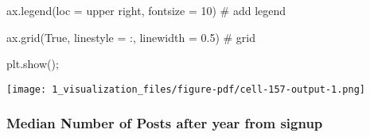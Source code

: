 \documentclass[
  letterpaper,
  DIV=11,
  numbers=noendperiod]{scrartcl}
\newenvironment{Shaded}{\begin{snugshade}}{\end{snugshade}}
\newcommand{\CommentTok}[1]{\textcolor[rgb]{0.37,0.37,0.37}{#1}}
\newcommand{\DecValTok}[1]{\textcolor[rgb]{0.68,0.00,0.00}{#1}}
\newcommand{\FloatTok}[1]{\textcolor[rgb]{0.68,0.00,0.00}{#1}}
\newcommand{\NormalTok}[1]{\textcolor[rgb]{0.00,0.23,0.31}{#1}}
\newcommand{\OperatorTok}[1]{\textcolor[rgb]{0.37,0.37,0.37}{#1}}
\newcommand{\StringTok}[1]{\textcolor[rgb]{0.13,0.47,0.30}{#1}}
\newcommand{\VariableTok}[1]{\textcolor[rgb]{0.07,0.07,0.07}{#1}}
\begin{document}
\begin{Shaded}
\begin{Highlighting}[]
\NormalTok{ax.legend(loc }\OperatorTok{=} \StringTok{\textquotesingle{}upper right\textquotesingle{}}\NormalTok{, fontsize }\OperatorTok{=} \DecValTok{10}\NormalTok{) }\CommentTok{\# add legend}

\NormalTok{ax.grid(}\VariableTok{True}\NormalTok{, linestyle }\OperatorTok{=} \StringTok{\textquotesingle{}:\textquotesingle{}}\NormalTok{, linewidth }\OperatorTok{=} \FloatTok{0.5}\NormalTok{) }\CommentTok{\# grid}

\NormalTok{plt.show()}\OperatorTok{;}
\end{Highlighting}
\end{Shaded}

\texttt{[image: 1\_visualization\_files/figure-pdf/cell-157-output-1.png]}

\subsubsection{Median Number of Posts after year from
signup}\label{median-number-of-posts-after-year-from-signup}
\end{document}
